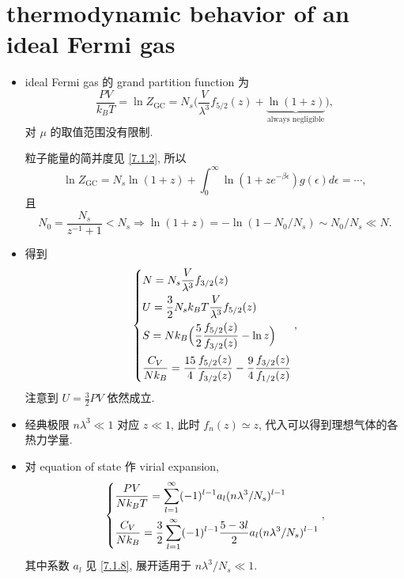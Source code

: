 \section{thermodynamic behavior of an ideal Fermi gas} \label{8.1}
\begin{itemize}
	\item ideal Fermi gas 的 grand partition function 为
	\begin{equation}
		\frac{P V}{k_B T} = \ln Z_\text{GC} = N_s \Big( \frac{V}{\lambda^3} f_{5 / 2}(z) + \underbrace{\ln(1 + z)}_{\text{always negligible}} \Big),
	\end{equation}
	对 $\mu$ 的取值范围没有限制.
	
	\begin{tcolorbox}[title=calculation:]
		粒子能量的简并度见 \eqref{7.1.2}, 所以
		\begin{equation}
			\ln Z_\text{GC} = N_s \ln(1 + z) + \int_0^\infty \ln(1 + z e^{- \beta \epsilon}) g(\epsilon) d\epsilon = \cdots,
		\end{equation}
		且
		\begin{equation}
			N_0 = \frac{N_s}{z^{- 1} + 1} < N_s \Longrightarrow \ln(1 + z) = - \ln(1 - N_0 / N_s) \sim N_0 / N_s \ll N.
		\end{equation}
	\end{tcolorbox}
	
	\item 得到
	\begin{equation}
		\begin{dcases}
			N = N_s \frac{V}{\lambda^3} f_{3 / 2}(z) \\
			U = \frac{3}{2} N_s k_B T \frac{V}{\lambda^3} f_{5 / 2}(z) \\
			S = N k_B \Big( \frac{5}{2} \frac{f_{5 / 2}(z)}{f_{3 / 2}(z)} - \ln z \Big) \\
			\frac{C_V}{N k_B} = \frac{15}{4} \frac{f_{5 / 2}(z)}{f_{3 / 2}(z)} - \frac{9}{4} \frac{f_{3 / 2}(z)}{f_{1 / 2}(z)}
		\end{dcases},
	\end{equation}
	注意到 $U = \frac{3}{2} P V$ 依然成立.
	
	\item 经典极限 $n \lambda^3 \ll 1$ 对应 $z \ll 1$, 此时 $f_n(z) \simeq z$, 代入可以得到理想气体的各热力学量.
	
	\item 对 equation of state 作 virial expansion,
	\begin{equation}
		\begin{dcases}
			\frac{P V}{N k_B T} = \sum_{l = 1}^\infty (- 1)^{l - 1} a_l (n \lambda^3 / N_s)^{l - 1} \\
			\frac{C_V}{N k_B} = \frac{3}{2} \sum_{l = 1}^\infty (- 1)^{l - 1} \frac{5 - 3 l}{2} a_l (n \lambda^3 / N_s)^{l - 1}
		\end{dcases},
	\end{equation}
	其中系数 $a_l$ 见 \eqref{7.1.8}, 展开适用于 $n \lambda^3 / N_s \ll 1$.
\end{itemize}

